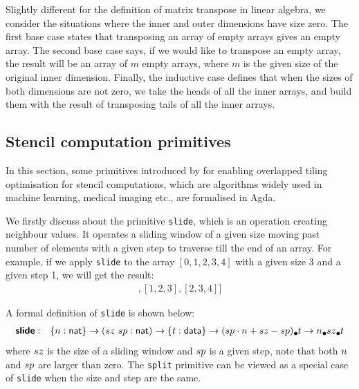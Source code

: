 \documentclass{l4proj}
\begin{document}
Slightly different for the definition of matrix transpose in linear algebra, we consider the situations where the inner and outer dimensions have size zero. The first base case states that transposing an array of empty arrays gives an empty array. The second base case says, if we would like to transpose an empty array, the result will be an array of $m$ empty arrays, where $m$ is the given size of the original inner dimension. Finally, the inductive case defines that when the sizes of both dimensions are not zero, we take the heads of all the inner arrays, and build them with the result of transposing tails of all the inner arrays.

\subsection{Stencil computation primitives}
\label{prim:stencil}
In this section, some primitives introduced by \cite{hagedorn2018high} for enabling overlapped tiling optimisation for stencil computations, which are algorithms widely used in machine learning, medical imaging etc., are formalised in Agda.

We firstly discuss about the primitive \texttt{slide}, which is an operation creating neighbour values. It operates a sliding window of a given size moving past number of elements with a given step to traverse till the end of an array. For example, if we apply \texttt{slide} to the array $[0, 1, 2, 3, 4]$ with a given size 3 and a given step 1, we will get the result:
\begin{align*}
    [[0, 1, 2], [1, 2, 3], [2, 3, 4]]
\end{align*}

A formal definition of \texttt{slide} is shown below:
\begin{align}
    \prim{slide}&:&\{\n : \natkind\} \to (\nat{sz}~\nat{sp} : \natkind) \to \{\dt : \datatype\} \to \lArray{\nat{(sp \cdot n + sz - sp)}}{\dt} \to \lArray{\n}{\lArray{\nat{sz}}{\dt}}
\end{align}
where $sz$ is the size of a sliding window and $sp$ is a given step, note that both $n$ and $sp$ are larger than zero. The \texttt{split} primitive can be viewed as a special case of \texttt{slide} when the size and step are the same.
\end{document}
